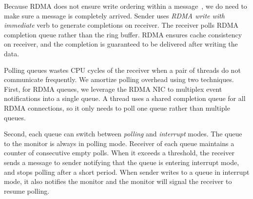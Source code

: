 Because RDMA does not ensure write ordering within a message~\cite{infiniband2000infiniband}, we do need to make sure a message is completely arrived. Sender uses \textit{RDMA write with immediate} verb to generate completions on receiver. The receiver polls RDMA completion queue rather than the ring buffer. RDMA ensures cache consistency on receiver, and the completion is guaranteed to be delivered after writing the data.


Polling queues wastes CPU cycles of the receiver when a pair of threads do not communicate frequently. We amortize polling overhead using two techniques.
First, for RDMA queues, we leverage the RDMA NIC to multiplex event notifications into a single queue.
A thread uses a shared completion queue for all RDMA connections, so it only needs to poll one queue rather than multiple queues.

Second, each queue can switch between \textit{polling} and \textit{interrupt} modes. The queue to the monitor is always in polling mode. Receiver of each queue maintains a counter of consecutive empty polls. When it exceeds a threshold, the receiver sends a message to sender notifying that the queue is entering interrupt mode, and stops polling after a short period. When sender writes to a queue in interrupt mode, it also notifies the monitor and the monitor will signal the receiver to resume polling.
